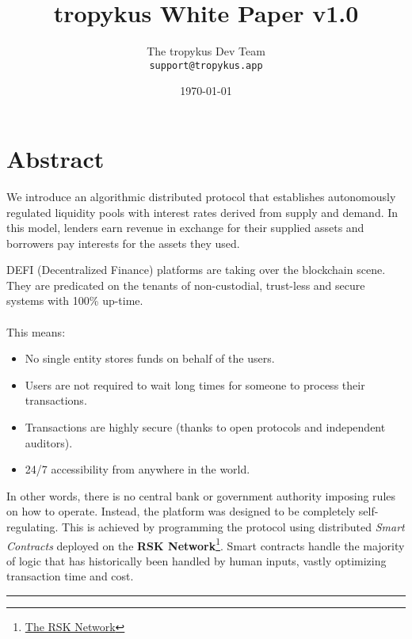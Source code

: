 \documentclass{article}
\title{tropykus White Paper v1.0} %
\author{The tropykus Dev Team\\ \texttt{support@tropykus.app}} %
\date{ \today} %
\begin{document}
\maketitle %


\section*{Abstract}

We introduce an algorithmic distributed protocol that establishes autonomously regulated liquidity pools with interest rates derived from supply and demand. In this model, lenders earn revenue in exchange for their supplied assets and borrowers pay interests for the assets they used.

DEFI (Decentralized Finance) platforms are taking over the blockchain scene. They are predicated on the tenants of non-custodial, trust-less and secure systems with 100\% up-time.
\\ \\
This means:
\begin{itemize}
\item No single entity stores funds on behalf of the users.
\item Users are not required to wait long times for someone to process their transactions.
\item Transactions are highly secure (thanks to open protocols and independent auditors).
\item 24/7 accessibility from anywhere in the world.
\end{itemize}
In other words, there is no central bank or government authority imposing rules on how to operate. Instead, the platform was designed to be completely self-regulating. This is achieved by programming the protocol using distributed \textit{Smart Contracts} deployed on the \textbf{RSK Network}\footnote{\href{https://www.rsk.co/}{The RSK Network}}. Smart contracts handle the majority of logic that has historically been handled by human inputs, vastly optimizing transaction time and cost.
\begin{center}
\noindent\rule{8cm}{0.4pt}
\end{center}

\end{document}
